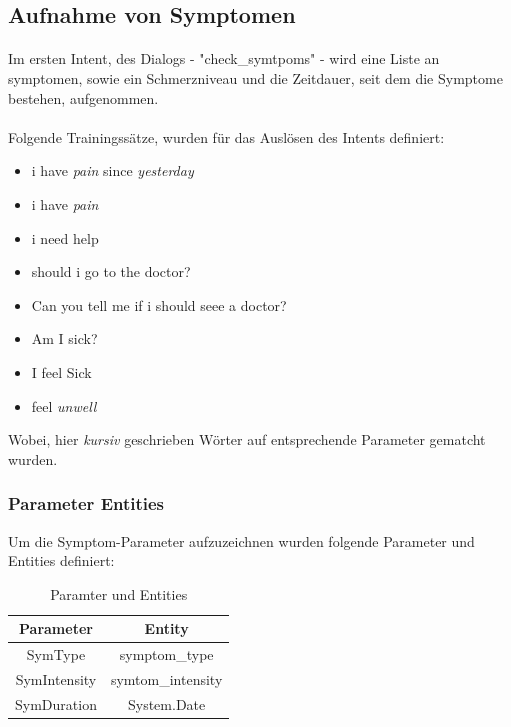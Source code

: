 \documentclass[11pt,a4paper]{article}
\begin{document}
    \subsection{Aufnahme von Symptomen}
        \paragraph{}
            Im ersten Intent, des Dialogs - "check\_symtpoms" - wird eine Liste an
            symptomen, sowie ein Schmerzniveau und die Zeitdauer, seit dem die Symptome
            bestehen, aufgenommen.

        \paragraph{}
            Folgende Trainingssätze, wurden für das Auslösen des Intents definiert:
            \begin{itemize}
                \item i have \emph{pain} since \emph{yesterday}
                \item i have \emph{pain}
                \item i need help
                \item should i go to the doctor?
                \item Can you tell me if i should seee a doctor?
                \item Am I sick?
                \item I feel Sick
                \item feel \emph{unwell}
            \end{itemize}
            Wobei, hier \emph{kursiv} geschrieben Wörter auf entsprechende Parameter gematcht wurden.

        \subsubsection{Parameter Entities}
            Um die Symptom-Parameter aufzuzeichnen wurden folgende Parameter und Entities definiert:
            \begin{table}[!h]
                \begin{center}
                    \begin{tabular}{c|c}
                        \textbf{Parameter} & \textbf{Entity}\\
                        \hline
                        SymType & symptom\_type\\
                        SymIntensity & symtom\_intensity\\
                        SymDuration & System.Date
                    \end{tabular}
                    \caption{Paramter und Entities}
                    \label{tab:tabelleParamsUndEntities}
                \end{center}
            \end{table}
            
\end{document}
